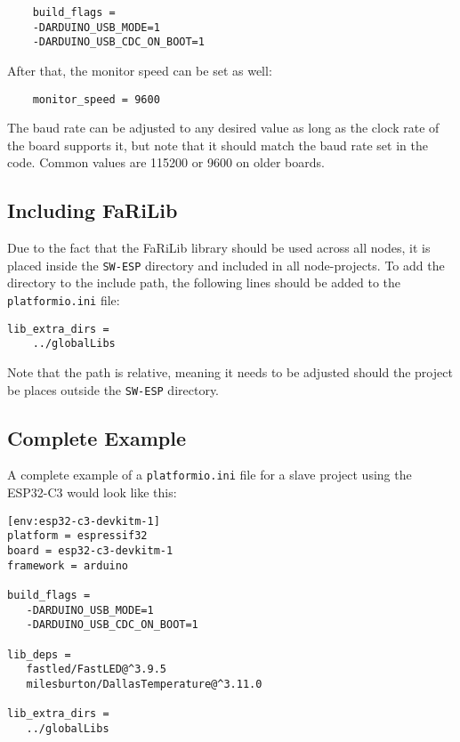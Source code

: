     \begin{verbatim}
    build_flags =
    -DARDUINO_USB_MODE=1
    -DARDUINO_USB_CDC_ON_BOOT=1
    \end{verbatim}
    After that, the monitor speed can be set as well:
    \begin{verbatim}
    monitor_speed = 9600
    \end{verbatim}
    The baud rate can be adjusted to any desired value as long as the clock rate
    of the board supports it, but note that it should match the baud rate set in 
    the code. Common values are 115200 or 9600 on older boards.

    \subsection{Including FaRiLib} \label{sec:farilib_include}
    Due to the fact that the FaRiLib library should be used across all nodes, it is
    placed inside the \texttt{SW-ESP} directory and included in all node-projects.
    To add the directory to the include path, the following lines should be added to
    the \texttt{platformio.ini} file:
    \begin{verbatim}
lib_extra_dirs =
    ../globalLibs
    \end{verbatim}
    Note that the path is relative, meaning it needs to be adjusted should the project
    be places outside the \texttt{SW-ESP} directory.

    \subsection{Complete Example}
    A complete example of a \texttt{platformio.ini} file for a slave project
    using the ESP32-C3 would look like this:

    \begin{verbatim}
[env:esp32-c3-devkitm-1]
platform = espressif32
board = esp32-c3-devkitm-1
framework = arduino

build_flags =
   -DARDUINO_USB_MODE=1
   -DARDUINO_USB_CDC_ON_BOOT=1

lib_deps = 
   fastled/FastLED@^3.9.5
   milesburton/DallasTemperature@^3.11.0

lib_extra_dirs =
   ../globalLibs
   \end{verbatim}


